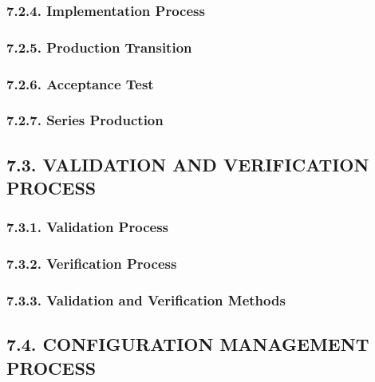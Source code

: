 \documentclass[
]{article}
\begin{document}
\hypertarget{implementation-process}{%
\subsubsection{7.2.4. Implementation
Process}\label{implementation-process}}

\hypertarget{production-transition}{%
\subsubsection{7.2.5. Production
Transition}\label{production-transition}}

\hypertarget{acceptance-test}{%
\subsubsection{7.2.6. Acceptance Test}\label{acceptance-test}}

\hypertarget{series-production}{%
\subsubsection{7.2.7. Series Production}\label{series-production}}

\hypertarget{validation-and-verification-process}{%
\subsection{7.3. VALIDATION AND VERIFICATION
PROCESS}\label{validation-and-verification-process}}

\hypertarget{validation-process}{%
\subsubsection{7.3.1. Validation Process}\label{validation-process}}

\hypertarget{verification-process}{%
\subsubsection{7.3.2. Verification Process}\label{verification-process}}

\hypertarget{validation-and-verification-methods}{%
\subsubsection{7.3.3. Validation and Verification
Methods}\label{validation-and-verification-methods}}

\hypertarget{configuration-management-process}{%
\subsection{7.4. CONFIGURATION MANAGEMENT
PROCESS}\label{configuration-management-process}}
\end{document}
